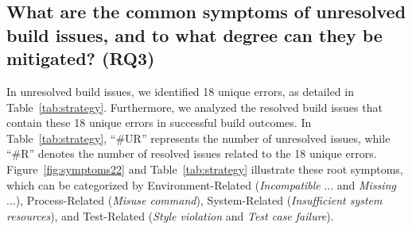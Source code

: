 \documentclass[10pt, conference]{IEEEtran}
\begin{document}
\begin{table}[tbp]
  \centering
  \caption{Success rate of verified build outcomes}
  \vspace{-.2cm}
  \label{tab:success}%
  \vspace{-.4cm}
\end{table}%



\subsection{What are the common symptoms of unresolved build issues, and to what degree can they be mitigated? (RQ3)}
\label{sec:RQ3}
In unresolved build issues, we identified 18 unique errors, as detailed in Table~\ref{tab:strategy}. Furthermore, we analyzed the resolved build issues that contain these 18 unique errors in successful build outcomes. In Table~\ref{tab:strategy}, ``\#UR'' represents the number of unresolved issues, while ``\#R'' denotes the number of resolved issues related to the 18 unique errors. Figure~\ref{fig:symptoms22} and Table~\ref{tab:strategy} illustrate these root symptoms, which can be categorized by Environment-Related (\textit{Incompatible} ... and \textit{Missing} ...), Process-Related (\textit{Misuse command}), System-Related (\textit{Insufficient system resources}), and Test-Related (\textit{Style violation} and \textit{Test case failure}).
\end{document}
